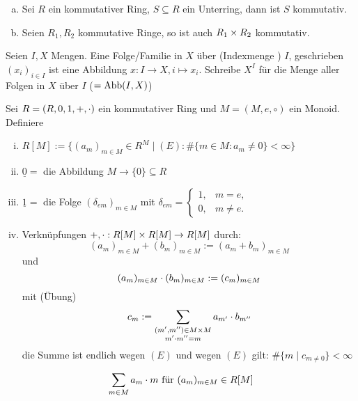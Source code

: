 \documentclass[a4paper]{report}
\begin{document}
\begin{bem*}[Übung]\item
  \begin{enumerate}[(a)]
    \item Sei $R$ ein kommutativer Ring, $S \subseteq R$ ein Unterring, dann ist $S$ kommutativ.
    \item Seien $R_{1}, R_{2}$ kommutative Ringe, so ist auch $R_{1} \times R_{2}$ kommutativ.
  \end{enumerate}
\end{bem*}

\begin{whg*}
Seien $I, X$ Mengen. Eine Folge/Familie in $X$ über (Indexmenge ) $I$, geschrieben $(x_{i})_{i \in I}$ ist eine Abbildung $x: I \to X, i \mapsto x_{i}$. Schreibe $X^{I}$ für die Menge aller Folgen in $X$ über $I$ ($=\operatorname{Abb}(I,X)$)
\end{whg*}

\begin{bsp}
  Sei $R = (R, 0, 1, +, \cdot)$ ein kommutativer Ring und $M = (M, e, \circ)$ ein Monoid. Definiere
  \begin{enumerate}[(i)]
    \item $R[M] := \{(a_{m})_{m \in M} \in R^{M} \mid (E): \# \{m \in M : a_{m} \ne 0\} < \infty\}$
    \item $\underline 0 = $ die Abbildung $M \to \{0\} \subseteq R$
    \item $\underline 1 = $ die Folge $(\delta_{em})_{m \in M}$ mit $\delta_{em} = \begin{cases} 1, & m = e, \\ 0, & m \ne e.\end{cases}$
    \item Verknüpfungen $+, \cdot : R[M] \times R[M] \to R[M]$ durch:
          \[(a_{m})_{m \in M} + (b_{m})_{m \in M} := (a_{m}+b_{m})_{m \in M}\]
          und
          \[(a_{m})_{m \in M} \cdot (b_{m})_{m \in M} := (c_{m})_{m \in M}\]
          mit (Übung)
          \[c_{m}:= \sum_{\substack{(m', m'') \in M \times M \\ m' \cdot m'' = m}}a_{m'} \cdot b_{m''}\]
          die Summe ist endlich wegen $(E)$ und wegen $(E)$ gilt: $\#\{m \mid c_{m \ne 0}\} < \infty$
  \end{enumerate}
\end{bsp}

\begin{nota*}
\[\sum_{m \in M}a_{m} \cdot m \text{ für } (a_{m})_{m \in M} \in R[M]\]
\end{nota*}
\end{document}
